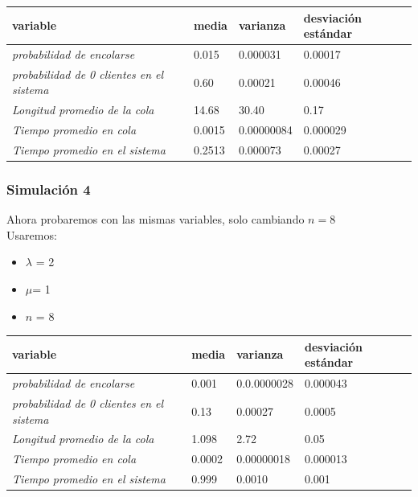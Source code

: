 \documentclass[11pt]{article}
\begin{document}
    \begin{table}[h]
\begin{tabular}{|l|l|l|l|}
\hline
\textbf{variable}                                 & \textbf{media} & \textbf{varianza} & \textbf{desviación estándar} \\ \hline
\textit{probabilidad de encolarse}                & 0.015          & 0.000031             & 0.00017                    \\ \hline
\textit{probabilidad de 0 clientes en el sistema} & 0.60          & 0.00021            & 0.00046                        \\ \hline
\textit{Longitud promedio de la cola}             & 14.68            & 30.40              & 0.17                         \\ \hline
\textit{Tiempo promedio en cola}                  & 0.0015           & 0.00000084            & 0.000029                     \\ \hline
\textit{Tiempo promedio en el sistema}            & 0.2513           & 0.000073             & 0.00027                      \\ \hline
\end{tabular}
\end{table} 

    \subsubsection{Simulación 4}
    Ahora probaremos con las mismas variables, solo cambiando $ n = 8$ \\
    Usaremos:
    \begin{itemize}
        \item $\lambda$ = 2
        \item $\mu $= 1
        \item $n$ = 8
    \end{itemize}

\begin{table}[h]
\begin{tabular}{|l|l|l|l|}
\hline
\textbf{variable}                                 & \textbf{media} & \textbf{varianza} & \textbf{desviación estándar} \\ \hline
\textit{probabilidad de encolarse}                & 0.001          & 0.0.0000028             & 0.000043                    \\ \hline
\textit{probabilidad de 0 clientes en el sistema} & 0.13          & 0.00027            & 0.0005                        \\ \hline
\textit{Longitud promedio de la cola}             & 1.098            & 2.72              & 0.05                         \\ \hline
\textit{Tiempo promedio en cola}                  & 0.0002          & 0.00000018            & 0.000013                     \\ \hline
\textit{Tiempo promedio en el sistema}            & 0.999           & 0.0010             & 0.001                     \\ \hline
\end{tabular}
\end{table}
\end{document}
